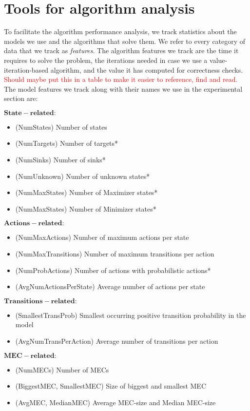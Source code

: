 \chapter{Tools for algorithm analysis} \label{ch:analysis}

To facilitate the algorithm performance analysis, we track statistics about the models we use and the algorithms that solve them. 
We refer to every category of data that we track as \emph{features}.
The algorithm features we track are the time it requires to solve the problem, the iterations needed in case we use a value-iteration-based algorithm, 
and the value it has computed for correctness checks.
\textcolor{red}{Should maybe put this in a table to make it easier to reference, find and read.}
The model features we track along with their names we use in the experimental section are:

$\mathbf{State-related:}$
\begin{itemize}
\item (NumStates) Number of states
\item (NumTargets) Number of targets*
\item (NumSinks) Number of sinks*
\item (NumUnknown) Number of unknown states*
\item (NumMaxStates) Number of Maximizer states*
\item (NumMaxStates) Number of Minimizer states*
\end{itemize}

$\mathbf{Actions-related:}$
\begin{itemize}
\item (NumMaxActions) Number of maximum actions per state
\item (NumMaxTransitions) Number of maximum transitions per action
\item (NumProbActions) Number of actions with probabilistic actions*
\item (AvgNumActionsPerState) Average number of actions per state
\end{itemize}

$\mathbf{Transitions-related:}$
\begin{itemize}
\item (SmallestTransProb) Smallest occurring positive transition probability in the model
\item (AvgNumTransPerAction) Average number of transitions per action
\end{itemize} 

$\mathbf{MEC-related:}$
\begin{itemize}
\item (NumMECs) Number of MECs
\item (BiggestMEC, SmallestMEC) Size of biggest and smallest MEC
\item (AvgMEC, MedianMEC) Average MEC-size and Median MEC-size
\end{itemize}

